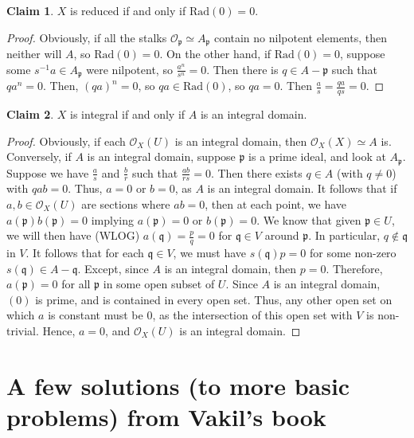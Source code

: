 \documentclass[aps,pra,showpacs,notitlepage,onecolumn,superscriptaddress,nofootinbib]{revtex4-1}
\theoremstyle{definition}
\newtheorem{claim}{Claim}[section]
\begin{document}
\begin{claim}
$X$ is reduced if and only if $\text{Rad}(0) = 0$.
  \end{claim}
\begin{proof}
Obviously, if all the stalks $\mathcal{O}_{\mathfrak{p}} \simeq A_{\mathfrak{p}}$ contain no nilpotent elements, then
neither will $A$, so $\text{Rad}(0) = 0$. On the other hand, if $\text{Rad}(0) = 0$, suppose some $s^{-1} a \in A_{\mathfrak{p}}$ were nilpotent, so $\frac{a^n}{s^n} = 0$. Then there is $q \in A - \mathfrak{p}$ such that $q a^n = 0$. Then, $(qa)^n = 0$,
so $qa \in \text{Rad}(0)$, so $qa = 0$. Then $\frac{a}{s} = \frac{qa}{qs} = 0$.
  \end{proof}

\begin{claim}
  $X$ is integral if and only if $A$ is an integral domain.
  \end{claim}
\begin{proof}
  Obviously, if each $\mathcal{O}_X(U)$ is an integral domain, then $\mathcal{O}_X(X) \simeq A$ is. Conversely, if $A$
  is an integral domain, suppose $\mathfrak{p}$ is a prime ideal, and look at $A_{\mathfrak{p}}$. Suppose we have $\frac{a}{s}$ and $\frac{b}{r}$ such that $\frac{ab}{rs} = 0$. Then there exists $q \in A$ (with $q \neq 0$) with $q a b = 0$. Thus,
  $a = 0$ or $b = 0$, as $A$ is an integral domain. It follows that if $a, b \in \mathcal{O}_X(U)$ are sections
  where $ab = 0$, then at each point, we have $a(\mathfrak{p}) b(\mathfrak{p}) = 0$ implying $a(\mathfrak{p}) = 0$
  or $b(\mathfrak{p}) = 0$. We know that given $\mathfrak{p} \in U$, we will then have (WLOG) $a(\mathfrak{q}) = \frac{p}{q} = 0$ for $\mathfrak{q} \in V$ around $\mathfrak{p}$. In particular,
  $q \notin \mathfrak{q}$ in $V$. It follows that for each $\mathfrak{q} \in V$, we must have $s(\mathfrak{q}) p = 0$ for some non-zero $s(\mathfrak{q}) \in A - \mathfrak{q}$. Except, since $A$ is an integral domain,
  then $p = 0$. Therefore, $a(\mathfrak{p}) = 0$ for all $\mathfrak{p}$ in some open subset of $U$. Since $A$ is an integral domain, $(0)$ is prime, and is contained in every open set. Thus, any other open set on which
  $a$ is constant must be $0$, as the intersection of this open set with $V$ is non-trivial. Hence, $a = 0$, and $\mathcal{O}_X(U)$ is an integral domain.
  \end{proof}

\section{A few solutions (to more basic problems) from Vakil's book}
\end{document}
